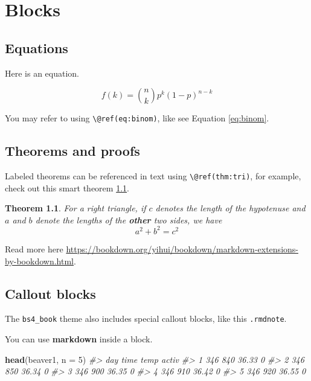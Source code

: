 \documentclass[
]{report}
\newenvironment{Shaded}{\begin{snugshade}}{\end{snugshade}}
\newcommand{\AttributeTok}[1]{\textcolor[rgb]{0.13,0.29,0.53}{#1}}
\newcommand{\CommentTok}[1]{\textcolor[rgb]{0.56,0.35,0.01}{\textit{#1}}}
\newcommand{\DecValTok}[1]{\textcolor[rgb]{0.00,0.00,0.81}{#1}}
\newcommand{\FunctionTok}[1]{\textcolor[rgb]{0.13,0.29,0.53}{\textbf{#1}}}
\newcommand{\NormalTok}[1]{#1}
\newtheorem{theorem}{Theorem}[chapter]
\theoremstyle{definition}
\theoremstyle{definition}
\theoremstyle{definition}
\theoremstyle{definition}
\theoremstyle{remark}
\begin{document}
\hypertarget{blocks}{%
\chapter{Blocks}\label{blocks}}

\hypertarget{equations}{%
\section{Equations}\label{equations}}

Here is an equation.

\begin{equation} 
  f\left(k\right) = \binom{n}{k} p^k\left(1-p\right)^{n-k}
  \label{eq:binom}
\end{equation}

You may refer to using \texttt{\textbackslash{}@ref(eq:binom)}, like see Equation \eqref{eq:binom}.

\hypertarget{theorems-and-proofs}{%
\section{Theorems and proofs}\label{theorems-and-proofs}}

Labeled theorems can be referenced in text using \texttt{\textbackslash{}@ref(thm:tri)}, for example, check out this smart theorem \ref{thm:tri}.

\begin{theorem}
\protect\hypertarget{thm:tri}{}\label{thm:tri}For a right triangle, if \(c\) denotes the \emph{length} of the hypotenuse
and \(a\) and \(b\) denote the lengths of the \textbf{other} two sides, we have
\[a^2 + b^2 = c^2\]
\end{theorem}

Read more here \url{https://bookdown.org/yihui/bookdown/markdown-extensions-by-bookdown.html}.

\hypertarget{callout-blocks}{%
\section{Callout blocks}\label{callout-blocks}}

The \texttt{bs4\_book} theme also includes special callout blocks, like this \texttt{.rmdnote}.

You can use \textbf{markdown} inside a block.

\begin{Shaded}
\begin{Highlighting}[]
\FunctionTok{head}\NormalTok{(beaver1, }\AttributeTok{n =} \DecValTok{5}\NormalTok{)}
\CommentTok{\#\textgreater{}   day time  temp activ}
\CommentTok{\#\textgreater{} 1 346  840 36.33     0}
\CommentTok{\#\textgreater{} 2 346  850 36.34     0}
\CommentTok{\#\textgreater{} 3 346  900 36.35     0}
\CommentTok{\#\textgreater{} 4 346  910 36.42     0}
\CommentTok{\#\textgreater{} 5 346  920 36.55     0}
\end{Highlighting}
\end{Shaded}
\end{document}
